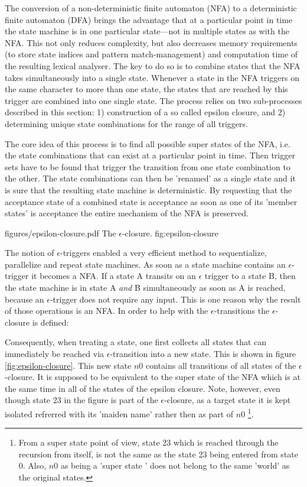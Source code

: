 The conversion of a non-deterministic finite automaton (NFA) to a deterministic
finite automaton (DFA) brings the advantage that at a particular point in time the state
machine is in one particular state---not in multiple states as with the NFA. This not only reduces
complexity, but also decreases memory requirements (to store state indices and
	pattern match-management) and computation time of the resulting lexical
analyser. The key to do so is to combine states that the NFA takes simultaneously
into a single state. Whenever a state in the NFA triggers on the same  character
to more than one state, the states that are reached by this trigger are combined
into one single state. The process relies on two sub-processes described in this section:
1) construction of a so called epsilon closure, and 2) determining unique state combinations
for the range of all triggers. 

The core idea of this process is to find all possible super states of the NFA, i.e. 
the state combinations that can exist at a particular point in time. Then trigger
sets have to be found that trigger the transition from one state combination to 
the other. The state combinations can then be 'renamed' as a single state and
it is sure that the resulting state machine is deterministic. By requesting
that the acceptance state of a combined state is acceptance as soon as one
of its 'member states' is acceptance the entire mechanism of the NFA is preserved.


\showpic
{figures/epsilon-closure.pdf}
{The $\epsilon$-closure.}
{fig:epsilon-closure}

The notion of $\epsilon$-triggers enabled a very efficient method to
sequentialize, parallelize and repeat state machines. As soon as a state
machine contains an $\epsilon$-trigger it becomes a NFA. If a state A transits
on an $\epsilon$ trigger to a state B, then the state machine is in state A
{\it and} B simultaneously as soon as A is reached, because an
$\epsilon$-trigger does not require any input. This is one reason why the
result of those operations is an NFA. In order to help with the $\epsilon$-transitions
the $\epsilon$-closure is defined:


Consequently, when treating a state, one first collects all states that can
immediately be reached via $\epsilon$-transition into a new state. This is
shown in figure \ref{fig:epsilon-closure}. This new state $n0$ contains all transitions of all
states of the $\epsilon$-closure. It is supposed to be equivalent to the 
super state of the NFA which is at the same time in all of the states of the epsilon closure.
Note, however, even though state 23 in the
figure is part of the $\epsilon$-closure, as a target state it is kept isolated
refrerred with its 'maiden name' rather then as part of $n0$
 \footnote{From a super state point of view, state 23 which is reached through
     the recursion from itself, is not the same as the state 23 being entered
	 from state 0. Also, $n0$ as being a 'super state ' does not belong to
	 the same 'world' as the original states.}. 

